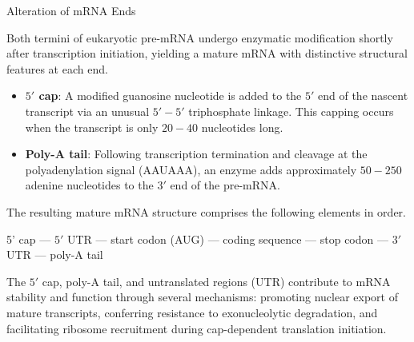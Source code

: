 \documentclass[10pt]{article}
\begin{document}
    \begin{core}{Alteration of mRNA Ends}
      
      Both termini of eukaryotic pre-mRNA undergo enzymatic modification shortly after transcription initiation, yielding a mature mRNA with distinctive structural features at each end.


      \begin{itemize}

        \item \textbf{$5'$ cap}: A modified guanosine nucleotide is added to the $5'$ end of the nascent transcript via an unusual $5'-5'$ triphosphate linkage. This capping occurs when the transcript is only $20-40$ nucleotides long.

        \item \textbf{Poly-A tail}: Following transcription termination and cleavage at the polyadenylation signal (AAUAAA), an enzyme adds approximately $50-250$ adenine nucleotides to the $3'$ end of the pre-mRNA.

      \end{itemize}
      
      The resulting mature mRNA structure comprises the following elements in order.

      \begin{center}

        5' cap --- $5'$ UTR --- start codon (AUG) --- coding sequence --- stop codon --- $3'$ UTR --- poly-A tail

      \end{center}

      The $5'$ cap, poly-A tail, and untranslated regions (UTR) contribute to mRNA stability and function through several mechanisms: promoting nuclear export of mature transcripts, conferring resistance to exonucleolytic degradation, and facilitating ribosome recruitment during cap-dependent translation initiation.

    \end{core}
\end{document}
